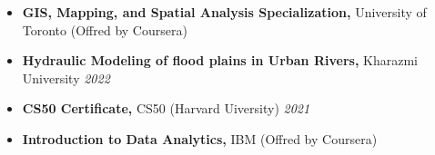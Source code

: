 \documentclass[letterpaper,11pt]{article}
\begin{document}
\begin{itemize}[left=0pt, label={}, topsep=7.5pt, partopsep=0pt, itemsep=6pt, parsep=0pt]
	\item \textbf{GIS, Mapping, and Spatial Analysis Specialization,} University of Toronto (Offred by Coursera) \hfill \textit{}
\end{itemize}
\vspace{-1.2em}
\begin{itemize}[left=0pt, label={}, topsep=7.5pt, partopsep=0pt, itemsep=6pt, parsep=0pt]
	\item \textbf{Hydraulic Modeling of flood plains in Urban Rivers,}  Kharazmi University \hfill \textit{2022}
\end{itemize}
\vspace{-1.2em}
\begin{itemize}[left=0pt, label={}, topsep=7.5pt, partopsep=0pt, itemsep=6pt, parsep=0pt]
	\item \textbf{CS50 Certificate,}  CS50 (Harvard Uiversity) \hfill \textit{2021}
\end{itemize}
\vspace{-1.2em}
\begin{itemize}[left=0pt, label={}, topsep=7.5pt, partopsep=0pt, itemsep=6pt, parsep=0pt]
	\item \textbf{Introduction to Data Analytics,}  IBM (Offred by Coursera) \hfill \textit{}
\end{itemize}
\vspace{-1.2em}
	\vspace{-0.6em} 
\end{document}

